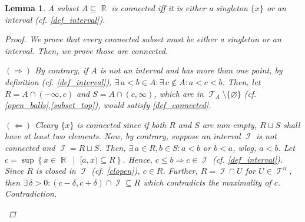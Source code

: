 \documentclass[12pt]{article}
\let\emptyset\varnothing
\let\RA\Rightarrow
\let\LA\Leftarrow
\newcommand{\set}[2]{\left\{{#1}\;\middle|\;{#2}\right\}}
\newcommand{\Exist}[1]{\exists\,{#1}:}
\DeclareMathOperator{\R}{\mathbb{R}}
\DeclareMathOperator{\I}{\mathcal{I}}
\DeclareMathOperator{\T}{\mathcal{T}}
\newtheorem{lemma}[theorem]{Lemma}
\begin{document}
\begin{lemma}
  \label{interval_connected}
  A subset $A\subseteq \R$ is connected iff it is either a singleton $\{x\}$ or an interval (cf. \ref{def_interval}).
  \begin{proof}
    We prove that every connected subset must be either a singleton or an interval. Then, we prove those are connected.
    \begin{compactitem}
      \item[$(\RA)$] By contrary, if $A$ is not an interval and has more than one point, by definition (cf. \ref{def_interval}), $\Exist{a<b\in A}\Exist{c\notin A}a<c<b$. Then, let $R=A\cap(-\infty,c)$ and $S=A\cap(c,\infty)$, which are in $\T_A\setminus\{\emptyset\}$ (cf. \ref{open_balls},\ref{subset_top}), would satisfy \ref{def_connected}.
      \item[$(\LA)$] Cleary $\{x\}$ is connected since if both $R$ and $S$ are non-empty, $R\sqcup S$ shall have at least two elements. Now, by contrary, suppose an interval $\I$ is not connected and $\I=R\sqcup S$. Then, $\Exist{a\in R,b\in S}a<b$ or $b<a$, wlog, $a<b$. Let $c=\sup\set{x\in\R}{[a,x)\subseteq R}$. Hence, $c\leq b\RA c\in\I$ (cf. \ref{def_interval}). Since $R$ is closed in $\I$ (cf. \ref{clopen}), $c\in R$. Further, $R=\I\cap U$ for $U\in\T^n$, then $\Exist{\delta>0}(c-\delta,c+\delta)\cap\I\subseteq R$ which contradicts the maximality of $c$. Contradiction.
    \end{compactitem}
  \end{proof}
\end{lemma}
\end{document}
